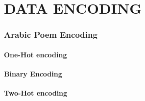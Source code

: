 \chapter{\uppercase{Data Encoding}}

 





\subsection{Arabic Poem Encoding}
\subsubsection{One-Hot encoding}
\subsubsection{Binary Encoding}
\subsubsection{Two-Hot encoding}
